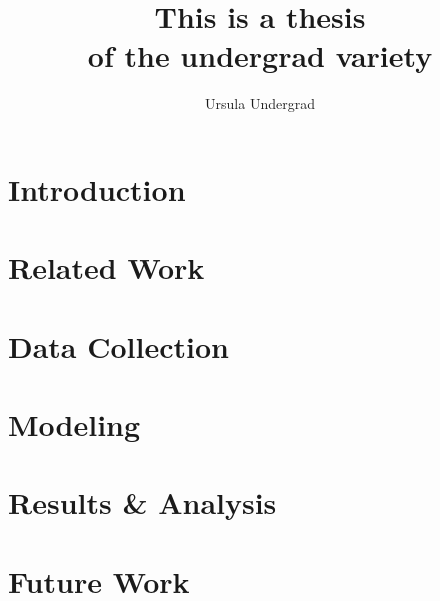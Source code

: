 \documentclass[twoside]{report}
\begin{document}
    \title{This is a thesis\\ of the undergrad variety}
\author{Ursula Undergrad}

\beforepreface
{}

\afterpreface

\chapter{Introduction}


\chapter{Related Work}


\chapter{Data Collection}


\chapter{Modeling}


\chapter{Results \& Analysis}



\chapter{Future Work}


\appendix

\renewcommand{\bibname}{Bibliography}


\end{document}
